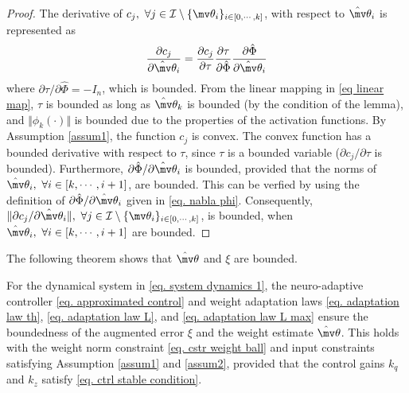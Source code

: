 \documentclass[lettersize,journal]{IEEEtran}
\newcommand*{\wth}{\mv\theta}
\begin{document}
\begin{proof}

The derivative of $c_j,\ \forall j\in\mathcal I \setminus \{\wth_i\}_{i\in[0,\cdots,k]}$, with respect to $\hat\wth_i$ is represented as
\begin{equation}
    {\partial c_j\over\partial \hat\wth_i} = {\partial c_j\over\partial \tau} {\partial \tau\over\partial \hat\Phi} {\partial \hat\Phi\over\partial \hat\wth_i}
\end{equation}
where $\partial \tau/\partial \hat\Phi=-I_n$, which is bounded. From the linear mapping in \eqref{eq linear map}, $\tau$ is bounded as long as $\hat\wth_k$ is bounded (by the condition of the lemma), and $\Vert\phi_k(\cdot)\Vert$ is bounded due to the properties of the activation functions. By Assumption \ref{assum1}, the function $c_j$ is convex. The convex function has a bounded derivative with respect to $\tau$, since $\tau$ is a bounded variable (\ie $\partial c_j/\partial\tau$ is bounded). Furthermore, $\partial \hat\Phi/\partial \hat\wth_i$ is bounded, provided that the norms of $\hat\wth_i,\ \forall i \in[k,\cdots,i+1]$, are bounded. This can be verfied by using the definition of $\partial \hat\Phi/\partial\hat\wth_i$ given in \eqref{eq. nabla phi}.
Consequently, $\Vert\partial c_j/\partial \hat\wth_i\Vert,\ \forall j\in\mathcal I \setminus \{\wth_i\}_{i\in[0,\cdots,k]}$, is bounded, when $\hat\wth_i,\ \forall i\in [k,\cdots,i+1]$ are bounded.

\end{proof}

The following theorem shows that $\hat\wth$ and $\xi$ are bounded.

\begin{theorem}
    For the dynamical system in \eqref{eq. system dynamics 1}, the neuro-adaptive controller \eqref{eq. approximated control} and weight adaptation laws \eqref{eq. adaptation law th}, \eqref{eq. adaptation law L}, and \eqref{eq. adaptation law L max} ensure the boundedness of the augmented error $\xi$ and the weight estimate $\hat \wth$. This holds with the weight norm constraint \eqref{eq. cstr weight ball} and input constraints satisfying Assumption \ref{assum1} and \ref{assum2}, provided that the control gains ${k_q}$ and ${k_z}$ satisfy \eqref{eq. ctrl stable condition}.
\end{theorem}
\end{document}
